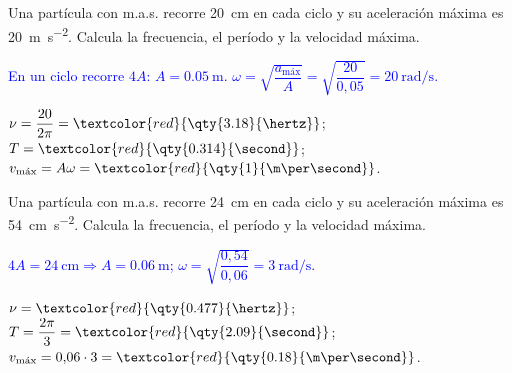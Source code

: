 \begin{exercise}
    Una partícula con m.a.s. recorre \qty{20}{\cm} en cada ciclo y su aceleración máxima es \qty{20}{\m\per\second\squared}.
    Calcula la frecuencia, el período y la velocidad máxima.
    \begin{solu}
        \textcolor{blue}{En un ciclo recorre \(4A\): \(A = \qty{0.05}{\m}\). \(\omega = \sqrt{\dfrac{a_{\text{máx}}}{A}} = \sqrt{\dfrac{20}{0{,}05}} = \qty{20}{\radian\per\second}\).}

        \(\nu = \dfrac{20}{2\pi} = \textcolor{red}{\qty{3.18}{\hertz}}\); \(T = \textcolor{red}{\qty{0.314}{\second}}\);
        \(v_{\text{máx}} = A\omega = \textcolor{red}{\qty{1}{\m\per\second}}\).
    \end{solu}
\end{exercise}

\begin{exercise}
    Una partícula con m.a.s. recorre \qty{24}{\cm} en cada ciclo y su aceleración máxima es \qty{54}{\cm\per\second\squared}.
    Calcula la frecuencia, el período y la velocidad máxima.
    \begin{solu}
        \textcolor{blue}{\(4A = \qty{24}{\cm} \Rightarrow A = \qty{0.06}{\m}\); \(\omega = \sqrt{\dfrac{0{,}54}{0{,}06}} = \qty{3}{\radian\per\second}\).}

        \(\nu = \textcolor{red}{\qty{0.477}{\hertz}}\); \(T = \dfrac{2\pi}{3} = \textcolor{red}{\qty{2.09}{\second}}\);
        \(v_{\text{máx}} = 0{,}06\cdot 3 = \textcolor{red}{\qty{0.18}{\m\per\second}}\).
    \end{solu}
\end{exercise}

